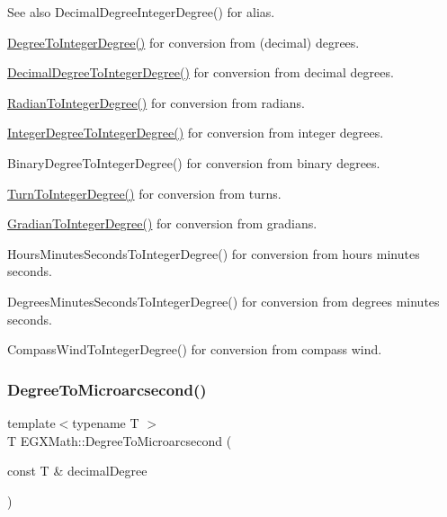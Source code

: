 \begin{DoxySeeAlso}{See also}
Decimal\+Degree\+Integer\+Degree() for alias. 

\mbox{\hyperlink{group___e_g_x_math-_angle_conversions-_degree_gaabd20f21be3c18ee423d0bc1a677c6f6}{Degree\+To\+Integer\+Degree()}} for conversion from (decimal) degrees. 

\mbox{\hyperlink{group___e_g_x_math-_angle_conversions-_decimal_degree_ga115239ea7202dbc6a6c9fba68e0ac189}{Decimal\+Degree\+To\+Integer\+Degree()}} for conversion from decimal degrees. 

\mbox{\hyperlink{group___e_g_x_math-_angle_conversions-_radian_gac84796dfdeb56235e1e338522a5f9350}{Radian\+To\+Integer\+Degree()}} for conversion from radians. 

\mbox{\hyperlink{group___e_g_x_math-_angle_conversions-_integer_degree_gac9e870bdfa60dd2bb61469fdf6eedd7c}{Integer\+Degree\+To\+Integer\+Degree()}} for conversion from integer degrees. 

Binary\+Degree\+To\+Integer\+Degree() for conversion from binary degrees. 

\mbox{\hyperlink{group___e_g_x_math-_angle_conversions-_turn_ga999085c62490997da870618e20e88ebb}{Turn\+To\+Integer\+Degree()}} for conversion from turns. 

\mbox{\hyperlink{group___e_g_x_math-_angle_conversions-_gradian_ga555aae885f8a7d0876a36aa07cbbd816}{Gradian\+To\+Integer\+Degree()}} for conversion from gradians. 

Hours\+Minutes\+Seconds\+To\+Integer\+Degree() for conversion from hours minutes seconds. 

Degrees\+Minutes\+Seconds\+To\+Integer\+Degree() for conversion from degrees minutes seconds. 

Compass\+Wind\+To\+Integer\+Degree() for conversion from compass wind. 
\end{DoxySeeAlso}
\mbox{\label{group___e_g_x_math-_angle_conversions-_degree_ga31b65388fe1b4656663b3d66b9d764e6}} 
\subsubsection{\texorpdfstring{Degree\+To\+Microarcsecond()}{DegreeToMicroarcsecond()}}
{\footnotesize\ttfamily template$<$typename T $>$ \\
T E\+G\+X\+Math\+::\+Degree\+To\+Microarcsecond (\begin{DoxyParamCaption}\item[{const T \&}]{decimal\+Degree }\end{DoxyParamCaption})}



